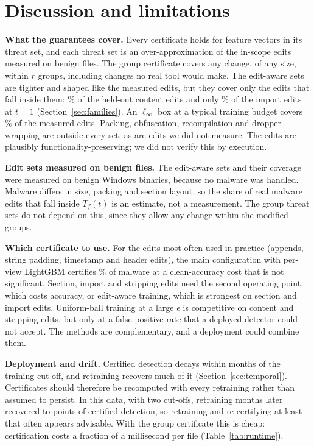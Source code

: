 \documentclass[preprint,12pt,authoryear]{elsarticle}
\begin{document}
\section{Discussion and limitations}\label{sec:discussion}
\textbf{What the guarantees cover.} Every certificate holds for feature vectors in its threat set, and each threat set is an over-approximation of the in-scope edits measured on \PsNFiles{} benign files. The group certificate covers any change, of any size, within $r$ groups, including changes no real tool would make. The edit-aware sets are tighter and shaped like the measured edits, but they cover only the edits that fall inside them: \FamContentCovOne\% of the held-out content edits and only \FamImportCovOne\% of the import edits at $t=1$ (Section~\ref{sec:families}). An $\ell_\infty$ box at a typical training budget covers \PsEpsLeTrainPct\% of the measured edits. Packing, obfuscation, recompilation and dropper wrapping are outside every set, as are edits we did not measure. The edits are plausibly functionality-preserving; we did not verify this by execution.

\textbf{Edit sets measured on benign files.} The edit-aware sets and their coverage were measured on benign Windows binaries, because no malware was handled. Malware differs in size, packing and section layout, so the share of real malware edits that fall inside $T_f(t)$ is an estimate, not a measurement. The group threat sets do not depend on this, since they allow any change within the modified groups.

\textbf{Which certificate to use.} For the edits most often used in practice (appends, string padding, timestamp and header edits), the main configuration with per-view LightGBM certifies \FamCertROneLgbmViews\% of malware at a clean-accuracy cost that is not significant. Section, import and stripping edits need the second operating point, which costs accuracy, or edit-aware training, which is strongest on section and import edits. Uniform-ball training at a large $\epsilon$ is competitive on content and stripping edits, but only at a false-positive rate that a deployed detector could not accept. The methods are complementary, and a deployment could combine them. %

\textbf{Deployment and drift.} Certified detection decays within months of the training cut-off, and retraining recovers much of it (Section~\ref{sec:temporal}). Certificates should therefore be recomputed with every retraining rather than assumed to persist. In this data, with two cut-offs, retraining \TdCutGapMonths{} months later recovered \TdRetrainGainMin{} to \TdRetrainGainMax{} points of certified detection, so retraining and re-certifying at least that often appears advisable. With the group certificate this is cheap: certification costs a fraction of a millisecond per file (Table~\ref{tab:runtime}). %
\end{document}
